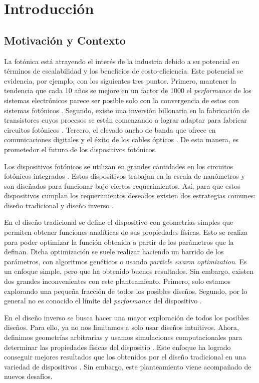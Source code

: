 \chapter{Introducción}

\section{Motivación y Contexto}

La fotónica está atrayendo el interés de la industria debido a su potencial en términos de escalabilidad y los beneficios de costo-eficiencia. 
Este potencial se evidencia, por ejemplo, con los siguientes tres puntos. 
Primero, mantener la tendencia que cada 10 años se mejore en un factor de 1000 el \emph{performance} de los sistemas electrónicos parece ser posible solo con la convergencia de estos con sistemas fotónicos \cite{Glick2018}. 
Segundo, existe una inversión billonaria en la fabricación de transistores cuyos procesos se están comenzando a lograr adaptar para fabricar circuitos fotónicos \cite{LukasChrostowski2010}.
Tercero, el elevado ancho de banda que ofrece en comunicaciones digitales y el éxito de los cables ópticos \cite{LukasChrostowski2010, Glick2018}.
De esta manera, es prometedor el futuro de los dispositivos fotónicos.

Los dispositivos fotónicos se utilizan en grandes cantidades en los circuitos fotónicos integrados \cite{LukasChrostowski2010}. 
Estos dispositivos trabajan en la escala de nanómetros y son diseñados para funcionar bajo ciertos requerimientos. 
Así, para que estos dispositivos cumplan los requerimientos deseados existen dos estrategias comunes: diseño tradicional y diseño inverso \cite{Molesky2018}.


En el diseño tradicional se define el dispositivo con geometrías simples que permiten obtener funciones analíticas de sus propiedades físicas. 
Esto se realiza para poder optimizar la función obtenida a partir de los parámetros que la definan. Dicha optimización se suele realizar haciendo
un barrido de los parámetros, con algoritmos genéticos o usando \emph{particle swarm optimization}. Es un enfoque simple, pero que ha obtenido
buenos resultados. Sin embargo, existen dos grandes inconvenientes con este planteamiento. 
Primero, solo estamos explorando una pequeña fracción de todos los posibles diseños.
Segundo, por lo general no es conocido el límite del \emph{performance} del dispositivo \cite{Molesky2018, Su2020}.


En el diseño inverso se busca hacer una mayor exploración de todos los posibles diseños. 
Para ello, ya no nos limitamos a solo usar diseños intuitivos. Ahora, definimos geometrías arbitrarias y usamos simulaciones computacionales para determinar las propiedades físicas del dispositio \cite{Molesky2018, Su2020}. Este enfoque ha logrado conseguir mejores resultados que los obtenidos por el diseño tradicional en una variedad de dispositivos \cite{Su2018, Molesky2018}. Sin embargo, este planteamiento viene acompañado de nuevos desafíos.



